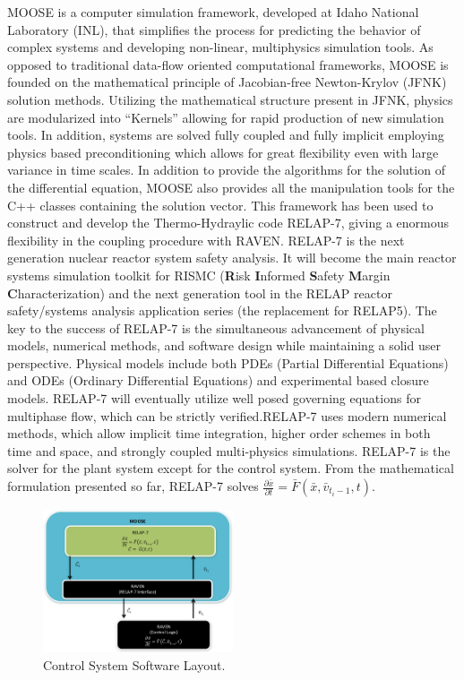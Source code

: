 \documentclass{mc2013}
\begin{document}
MOOSE is a computer simulation framework,  developed at Idaho National Laboratory (INL), that simplifies the process for predicting the behavior of complex systems and developing non-linear, multiphysics simulation tools. As opposed to traditional data-flow oriented computational frameworks, MOOSE is founded on the mathematical principle of Jacobian-free Newton-Krylov (JFNK) solution methods. Utilizing the mathematical structure present in JFNK, physics are modularized into “Kernels” allowing for rapid production of new simulation tools. In addition, systems are solved fully coupled and fully implicit employing physics based preconditioning which allows for great flexibility even with large variance in time scales. In addition to provide the algorithms for the solution of the differential equation, MOOSE also provides all the manipulation tools for the C++ classes containing the solution vector. This framework has been used to construct and develop the Thermo-Hydraylic code RELAP-7, giving a enormous flexibility in the coupling procedure with RAVEN.
RELAP-7 is the next generation nuclear reactor system safety analysis. It will become the main reactor systems simulation toolkit for RISMC (\textbf{R}isk \textbf{I}nformed \textbf{S}afety \textbf{M}argin \textbf{C}haracterization) and the next generation tool in the RELAP reactor safety/systems analysis application series (the replacement for RELAP5). The key to the success of RELAP-7 is the simultaneous advancement of physical models, numerical methods, and software design while maintaining a solid user perspective. Physical models include both PDEs (Partial Differential Equations) and ODEs (Ordinary Differential Equations) and experimental based closure models. RELAP-7 will eventually utilize well posed governing equations for multiphase flow, which can be strictly verified.RELAP-7 uses modern numerical methods, which allow implicit time integration, higher order schemes in both time and space, and strongly coupled multi-physics simulations.
RELAP-7 is the solver for the plant system except for the control system. From the mathematical
formulation presented so far, RELAP-7 solves 
$\frac{\partial \bar{x}}{\partial t} = \bar{F}(\bar{x},\bar{v}_{t_{i}-1},t)$.
\begin{figure}[h] 
  \centering
     \includegraphics[width=0.5\textwidth]{figures/ControlSystemSoftwareLayout.pdf}
  \caption{Control System Software Layout.}
   \label{fig:ControlSoftwareLayout}
\end{figure}
\end{document}
